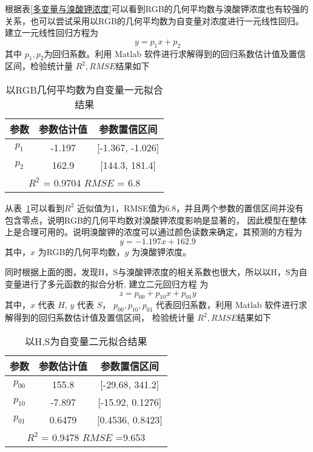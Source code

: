     根据表\ref{多变量与溴酸钾浓度}可以看到RGB的几何平均数与溴酸钾浓度也有较强的关系，也可以尝试采用以RGB的几何平均数为自变量对浓度进行一元线性回归。
    建立一元线性回归方程为
     $$ y = p_1 x + p_2$$
    其中 $p_1, p_2$为回归系数。利用 Matlab 软件进行求解得到的回归系数估计值及置信区间，检验统计量 $R^2, RMSE $结果如下

    \begin{table}[H]
        \centering
        \caption{以RGB几何平均数为自变量一元拟合结果}
        \label{RGB拟合}
        \begin{tabular}{@{}ccc@{}}
        \toprule
        参数        & 参数估计值     & 参数置信区间                  \\ \midrule
        $p_1$     & -1.197    & {[}-1.367, -1.026{]}    \\
        $p_2$     & 162.9     & {[}144.3, 181.4{]}      \\
        \hline
        \multicolumn{3}{c}{$R^2$ = 0.9704 $RMSE$ = 6.8} \\ \bottomrule
        \end{tabular}
        \end{table}

    从表~\ref{RGB拟合}可以看到$R^2$ 近似值为1，RMSE值为6.8，并且两个参数的置信区间并没有包含零点，说明RGB的几何平均数对溴酸钾浓度影响是显著的，
    因此模型在整体上是合理可用的。说明溴酸钾的浓度可以通过颜色读数来确定，其预测的方程为
    $$ y = -1.197 x + 162.9 $$
    其中，$x$ 为RGB的几何平均数，$y$ 为溴酸钾浓度。

    同时根据上面的图，发现H，S与溴酸钾浓度的相关系数也很大，所以以H，S为自变量进行了多元函数的拟合分析,
    建立二元回归方程 为
    $$ z = p_{00} + p_{10} x + p_{01} y$$
    其中，$x$ 代表 $H$, $y$ 代表 $S$， $p_{00},p_{10},p_{01}$ 代表回归系数，利用 Matlab 软件进行求解得到的回归系数估计值及置信区间，
    检验统计量 $R^2, RMSE $结果如下

    \begin{table}[H]
        \centering
        \caption{以H,S为自变量二元拟合结果}
        \label{二元拟合结果}
        \begin{tabular}{@{}ccc@{}}
        \toprule
        参数         & 参数估计值     & 参数置信区间                  \\ \midrule
        $p_00$     & 155.8     & {[}-29.68, 341.2{]}     \\
        $p_10$     & -7.897    & {[}-15.92, 0.1276{]}    \\
        $p_01$     & 0.6479    & {[}0.4536, 0.8423{]}    \\
        \hline
        \multicolumn{3}{c}{$R^2$ = 0.9478 $RMSE$ =9.653} \\ \bottomrule
        \end{tabular}
        \end{table}

